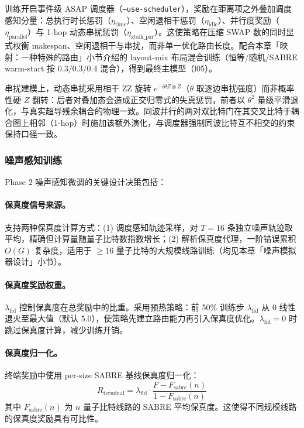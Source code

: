 训练开启事件级 ASAP 调度器（\texttt{--use-scheduler}），奖励在距离项之外叠加调度感知分量：总执行时长惩罚（$\eta_{\text{time}}$）、空闲退相干惩罚（$\eta_{\text{idle}}$）、并行度奖励（$\eta_{\text{parallel}}$）与 1-hop 动态串扰惩罚（$\eta_{\text{xtalk\_par}}$）。这使策略在压缩 SWAP 数的同时显式权衡 makespan、空闲退相干与串扰，而非单一优化路由长度。配合本章「映射：一种特殊的路由」小节介绍的 layout-mix 布局混合训练（恒等/随机/SABRE warm-start 按 $0.3/0.3/0.4$ 混合），得到最终主模型（l05）。

串扰建模上，动态串扰采用相干 ZZ 旋转 $e^{-i\theta Z\otimes Z}$（$\theta$ 取逐边串扰强度）而非概率性硬 $Z$ 翻转：后者对叠加态会造成正交归零式的失真惩罚，前者以 $\theta^2$ 量级平滑退化，与真实超导残余耦合的物理一致。同波并行的两对双比特门在其交叉比特于耦合图上相邻（1-hop）时施加该额外演化，与调度器强制同波比特互不相交的约束保持口径一致。

\subsubsection{噪声感知训练}

Phase 2 噪声感知微调的关键设计决策包括：

\paragraph{保真度信号来源。} 支持两种保真度计算方式：(1) 调度感知轨迹采样，对 $T=16$ 条独立噪声轨迹取平均，精确但计算量随量子比特数指数增长；(2) 解析保真度代理，一阶错误累积 $O(G)$ 复杂度，适用于 $\geq 16$ 量子比特的大规模线路训练（均见本章「噪声模拟器设计」小节）。

\paragraph{保真度奖励权重。} $\lambda_{\text{fid}}$ 控制保真度在总奖励中的比重。采用预热策略：前 50\% 训练步 $\lambda_{\text{fid}}$ 从 0 线性退火至最大值（默认 5.0），使策略先建立路由能力再引入保真度优化。$\lambda_{\text{fid}} = 0$ 时跳过保真度计算，减少训练开销。

\paragraph{保真度归一化。} 终端奖励中使用 per-size SABRE 基线保真度归一化：
\[
R_{\text{terminal}} = \lambda_{\text{fid}} \cdot \frac{F - F_{\text{sabre}}(n)}{1 - F_{\text{sabre}}(n)}
\]
其中 $F_{\text{sabre}}(n)$ 为 $n$ 量子比特线路的 SABRE 平均保真度。这使得不同规模线路的保真度奖励具有可比性。

